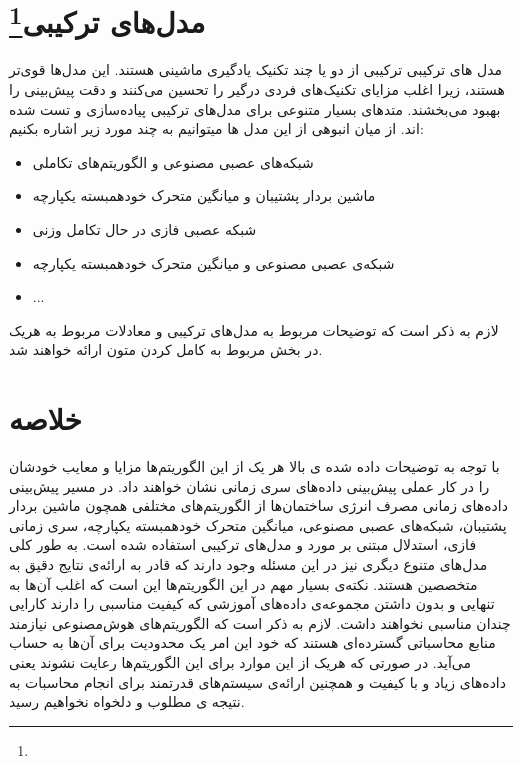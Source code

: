 \section{مدل‌های ترکیبی‌\footnote{}}
مدل های ترکیبی ترکیبی از دو یا چند تکنیک یادگیری ماشینی هستند. این مدل‌ها قوی‌تر هستند، 
زیرا اغلب مزایای تکنیک‌های فردی درگیر را تحسین می‌کنند و دقت پیش‌بینی را بهبود می‌بخشند.
متد‌های بسیار متنوعی برای مدل‌های ترکیبی پیاده‌سازی و تست شده اند. از میان انبوهی از این مدل ها میتوانیم به چند مورد زیر اشاره بکنیم:
\begin{itemize}
    \item شبکه‌های عصبی مصنوعی و الگوریتم‌های تکاملی\cite{azadeh2007integration}
    \item ماشین بردار پشتیبان و میانگین متحرک خودهمبسته یکپارچه\cite{nie2012hybrid}
    \item شبکه عصبی فازی در حال تکامل وزنی \cite{chang2011monthly}
    \item شبکه‌ی عصبی مصنوعی و میانگین متحرک خودهمبسته یکپارچه\cite{wang2014techniques}
    \item ...
\end{itemize}

لازم به ذکر است که توضیحات مربوط به مدل‌های ترکیبی و معادلات مربوط به هریک در بخش مربوط به کامل کردن متون ارائه خواهند شد.
\section{خلاصه}

با توجه به توضیحات داده شده ی بالا هر یک از این الگوریتم‌ها مزایا و معایب خودشان را در کار عملی پیش‌بینی داده‌های سری زمانی نشان خواهند داد. 
 در مسیر پیش‌بینی داده‌های زمانی مصرف انرژی ساختمان‌ها از الگوریتم‌های مختلفی همچون 
 ماشین بردار پشتیبان، شبکه‌های عصبی مصنوعی، میانگین متحرک خودهمبسته یکپارچه، سری زمانی فازی، استدلال مبتنی بر مورد و مدل‌های ترکیبی استفاده شده است.
 به طور کلی مدل‌های متنوع دیگری نیز در این مسئله وجود دارند که قادر به ارائه‌ی نتایج دقیق به متخصصین هستند. نکته‌ی بسیار مهم در این الگوریتم‌ها این است که اغلب آن‌ها به تنهایی و بدون داشتن مجموعه‌ی داده‌های آموزشی که کیفیت مناسبی را دارند
 کارایی چندان مناسبی نخواهند داشت. لازم به ذکر است که الگوریتم‌های هوش‌مصنوعی نیازمند منابع محاسباتی گسترده‌ای هستند که خود این امر یک محدودیت برای آن‌ها به حساب می‌آید.
 در صورتی که هریک از این موارد برای این الگوریتم‌ها رعایت نشوند یعنی داده‌های زیاد و با کیفیت و همچنین ارائه‌ی سیستم‌های قدرتمند برای انجام محاسبات به نتیجه ی مطلوب و دلخواه نخواهیم رسید.